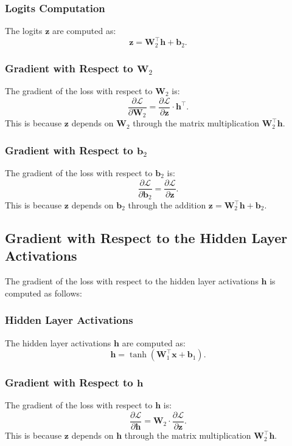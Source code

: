 \begin{notechapter}
\subsubsection{Logits Computation}
The logits \(\mathbf{z}\) are computed as:
\[
\mathbf{z} = \mathbf{W}_2^\top \mathbf{h} + \mathbf{b}_2.
\]

\subsubsection{Gradient with Respect to \(\mathbf{W}_2\)}
The gradient of the loss with respect to \(\mathbf{W}_2\) is:
\[
\frac{\partial \mathcal{L}}{\partial \mathbf{W}_2} =
\frac{\partial \mathcal{L}}{\partial \mathbf{z}} \cdot \mathbf{h}^\top.
\]
This is because \(\mathbf{z}\) depends on \(\mathbf{W}_2\) through the matrix
multiplication \(\mathbf{W}_2^\top \mathbf{h}\).

\subsubsection{Gradient with Respect to \(\mathbf{b}_2\)}
The gradient of the loss with respect to \(\mathbf{b}_2\) is:
\[
\frac{\partial \mathcal{L}}{\partial \mathbf{b}_2} =
\frac{\partial \mathcal{L}}{\partial \mathbf{z}}.
\]
This is because \(\mathbf{z}\) depends on \(\mathbf{b}_2\) through the addition
\(\mathbf{z} = \mathbf{W}_2^\top \mathbf{h} + \mathbf{b}_2\).

\subsection{Gradient with Respect to the Hidden Layer Activations}
The gradient of the loss with respect to the hidden layer activations \(\mathbf{h}\)
is computed as follows:

\subsubsection{Hidden Layer Activations}
The hidden layer activations \(\mathbf{h}\) are computed as:
\[
\mathbf{h} = \tanh(\mathbf{W}_1^\top \mathbf{x} + \mathbf{b}_1).
\]

\subsubsection{Gradient with Respect to \(\mathbf{h}\)}
The gradient of the loss with respect to \(\mathbf{h}\) is:
\[
\frac{\partial \mathcal{L}}{\partial \mathbf{h}} =
\mathbf{W}_2 \cdot \frac{\partial \mathcal{L}}{\partial \mathbf{z}}.
\]
This is because \(\mathbf{z}\) depends on \(\mathbf{h}\) through the matrix
multiplication \(\mathbf{W}_2^\top \mathbf{h}\).


\end{notechapter}
